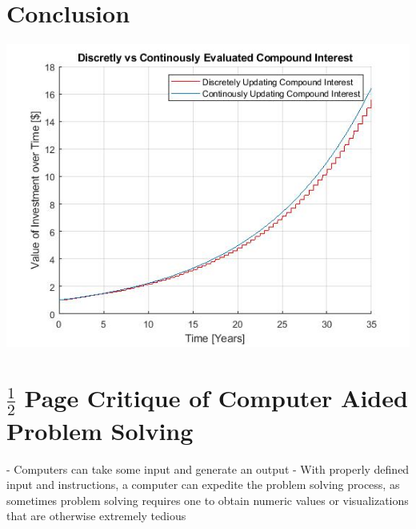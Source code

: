 \documentclass[10pt]{report}
\begin{document}
    \section*{Conclusion}
    \includegraphics[width=\textwidth]{graph_final_2d.jpg}

    \section*{$\frac{1}{2}$ Page Critique of Computer Aided Problem Solving}

    - Computers can take some input and generate an output
    - With properly defined input and instructions, a computer can expedite the problem solving process, as sometimes problem solving requires one to obtain numeric values or visualizations that are otherwise extremely tedious
\end{document}
